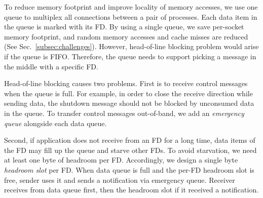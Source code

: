 To reduce memory footprint and improve locality of memory accesses, we use one queue to multiplex all connections between a pair of processes. Each data item in the queue is marked with its FD. By using a single queue, we save per-socket memory footprint, and random memory accesses and cache misses are reduced (See Sec.~\ref{subsec:challenges}). However, head-of-line blocking problem would arise if the queue is FIFO. 
Therefore, the queue needs to support picking a message in the middle with a specific FD. 

Head-of-line blocking causes two problems. First is to receive control messages when the queue is full. For example, in order to close the receive direction while sending data, the shutdown message should not be blocked by unconsumed data in the queue. To transfer control messages out-of-band, we add an \textit{emergency queue} alongside each data queue.

Second, if application does not receive from an FD for a long time, data items of the FD may fill up the queue and starve other FDs. To avoid starvation, we need at least one byte of headroom per FD. Accordingly, we design a single byte \textit{headroom slot} per FD. When data queue is full and the per-FD headroom slot is free, sender uses it and sends a notification via emergency queue. Receiver receives from data queue first, then the headroom slot if it received a notification.

